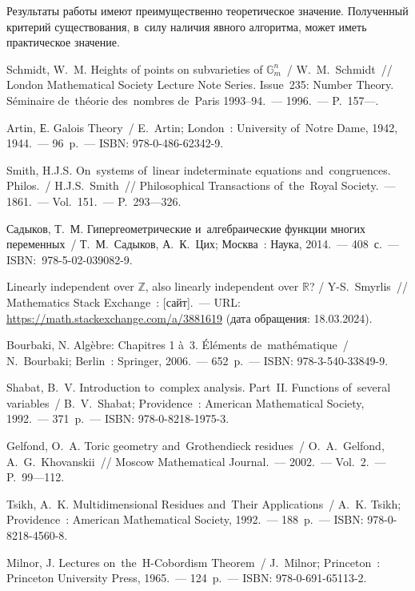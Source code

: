 \documentclass[a4paper,oneside]{article}
\begin{document}
Результаты работы имеют преимущественно теоретическое значение. Полученный критерий существования,
в~силу наличия явного алгоритма, может иметь практическое значение.

\pagebreak

\begin{thebibliography}{}
\setlength\itemindent{12.5mm}

 Schmidt, W.~M. Heights of points on subvarieties of $\mathbb{G}^n_m$~/ W.~M.~{Sch\-midt}~//
London Mathematical Society Lecture Note Series. Issue~235: Number Theory.
Séminaire de~théorie des~nombres de~Paris 1993–94.~— 1996.~— P.~157—.

 Artin, Е. Galois Theory~/ E.~Artin; London~: University of~Notre Dame, 1942, 1944.~— 96~p.~— ISBN: 978-0-486-62342-9.

 Smith, H.J.S. On~systems of~linear indeterminate equations and~{con\-gru\-ences}. Philos.~/ H.J.S.~Smith~//
Philosophical Transactions of~the~Royal Society.~— 1861.~— Vol.~151.~— P.~293—326.

 Садыков, Т.~М. Гипергеометрические и~алгебраические функции многих переменных~/ Т.~М.~Садыков, А.~К.~Цих;
Москва~: Наука, 2014.~— 408~с.~— ISBN: 978-5-02-039082-9.

 Linearly independent over $\mathbb{Z}$, also linearly independent over $\mathbb{R}$? / Y-S.~Smyrlis~//
Mathematics Stack Exchange~: [сайт].~— URL: \url{https://math.stackexchange.com/a/3881619} (дата обращения: 18.03.2024).

 Bourbaki, N. Algèbre: Chapitres 1 à~3. Éléments de~mathématique~/ N.~Bourbaki; Berlin~: Springer, 2006.~— 652~p.~— ISBN: 978-3-540-33849-9.

 Shabat, B.~V. Introduction to~complex analysis. Part~II. Functions of~several variables~/ B.~V.~Shabat; Providence~: American Mathematical Society, 1992.~— 371~p.~— ISBN: 978-0-8218-1975-3.

 Gelfond, O.~A. Toric geometry and~Grothendieck residues~/ O.~A.~{Gel\-fond}, A.~G.~Khovanskii~//
Moscow Mathematical Journal.~— 2002.~— Vol.~2.~— P.~99—112.

 Tsikh, A.~K. Multidimensional Residues and~Their Applications~/ A.~K. Tsikh; Providence~: American Mathematical Society, 1992.~— 188~p.~— ISBN: 978-0-8218-4560-8.

 Milnor, J. Lectures on~the~H-Cobordism Theorem~/ J.~Milnor; Princeton~: Princeton University Press, 1965.~— 124~p.~— ISBN: 978-0-691-65113-2.


\end{thebibliography}
\end{document}
